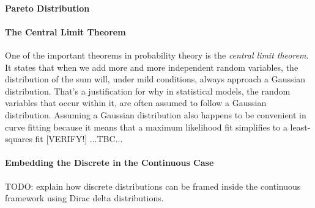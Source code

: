 \paragraph{Pareto Distribution}





\paragraph{The Central Limit Theorem}
One of the important theorems in probability theory is the \emph{central limit theorem}. It states that when we add more and more independent random variables, the distribution of the sum will, under mild conditions, always approach a Gaussian distribution. That's a justification for why in statistical models, the random variables that occur within it, are often assumed to follow a Gaussian distribution. Assuming a Gaussian distribution also happens to be convenient in curve fitting because it means that a maximum likelihood fit simplifies to a least-squares fit [VERIFY!] ...TBC...


\paragraph{Embedding the Discrete in the Continuous Case}
TODO: explain how discrete distributions can be framed inside the continuous framework using Dirac delta distributions. 





